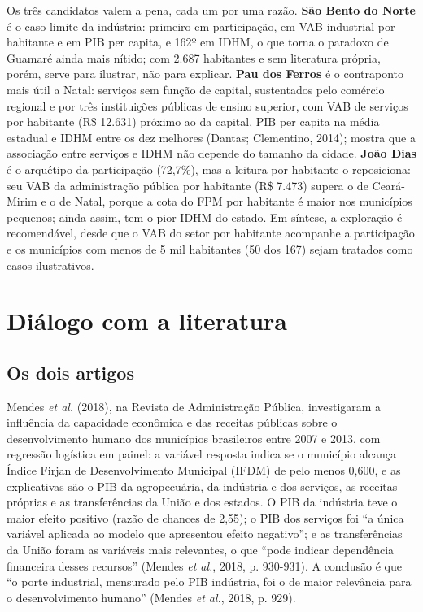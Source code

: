 \documentclass[12pt,a4paper]{article}
\begin{document}
Os três candidatos valem a pena, cada um por uma razão. \textbf{São Bento do Norte} é o caso-limite da indústria: primeiro em participação, em VAB industrial por habitante e em PIB per capita, e 162º em IDHM, o que torna o paradoxo de Guamaré ainda mais nítido; com 2.687 habitantes e sem literatura própria, porém, serve para ilustrar, não para explicar. \textbf{Pau dos Ferros} é o contraponto mais útil a Natal: serviços sem função de capital, sustentados pelo comércio regional e por três instituições públicas de ensino superior, com VAB de serviços por habitante (R\$ 12.631) próximo ao da capital, PIB per capita na média estadual e IDHM entre os dez melhores (Dantas; Clementino, 2014); mostra que a associação entre serviços e IDHM não depende do tamanho da cidade. \textbf{João Dias} é o arquétipo da participação (72,7\%), mas a leitura por habitante o reposiciona: seu VAB da administração pública por habitante (R\$ 7.473) supera o de Ceará-Mirim e o de Natal, porque a cota do FPM por habitante é maior nos municípios pequenos; ainda assim, tem o pior IDHM do estado. Em síntese, a exploração é recomendável, desde que o VAB do setor por habitante acompanhe a participação e os municípios com menos de 5 mil habitantes (50 dos 167) sejam tratados como casos ilustrativos.

\section{Diálogo com a literatura}

\subsection{Os dois artigos}

Mendes \textit{et al.} (2018), na Revista de Administração Pública, investigaram a influência da capacidade econômica e das receitas públicas sobre o desenvolvimento humano dos municípios brasileiros entre 2007 e 2013, com regressão logística em painel: a variável resposta indica se o município alcança Índice Firjan de Desenvolvimento Municipal (IFDM) de pelo menos 0,600, e as explicativas são o PIB da agropecuária, da indústria e dos serviços, as receitas próprias e as transferências da União e dos estados. O PIB da indústria teve o maior efeito positivo (razão de chances de 2,55); o PIB dos serviços foi ``a única variável aplicada ao modelo que apresentou efeito negativo''; e as transferências da União foram as variáveis mais relevantes, o que ``pode indicar dependência financeira desses recursos'' (Mendes \textit{et al.}, 2018, p. 930-931). A conclusão é que ``o porte industrial, mensurado pelo PIB indústria, foi o de maior relevância para o desenvolvimento humano'' (Mendes \textit{et al.}, 2018, p. 929).
\end{document}
